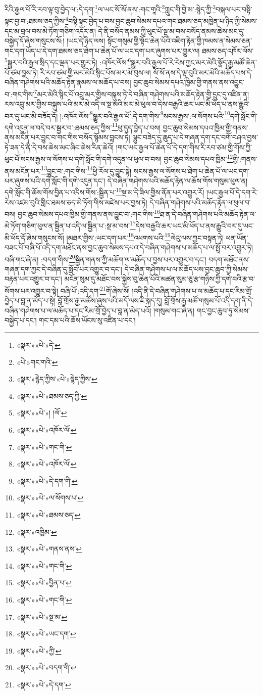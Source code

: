 རིའི་རྒྱལ་པོ་རི་རབ་ལྟ་བུ་བྱེད་ལ་:དེ་དག་\footnote{«སྣར་»«པེ་»དེ་}ལ་ཡང་སོ་སོ་ནས་:གང་གཱའི་\footnote{«པེ་»གང་གའི་}ཀླུང་གི་བྱེ་མ་:སྙེད་ཀྱི་\footnote{«སྣར་»རྙེད་ཀྱིས་«པེ་»སྙེད་ཀྱིས་}བསྐལ་པར་བསྟི་སྟང་བྱ་བ་:ཐམས་ཅད་ཀྱིས་\footnote{«སྣར་»«པེ་»ཐམས་ཅད་ཀྱི་}བསྟི་སྟང་བྱེད་པ་བས་བྱང་ཆུབ་སེམས་དཔའ་གང་ཐམས་ཅད་མཁྱེན་པ་ཉིད་ཀྱི་སེམས་དང་མ་བྲལ་བས་མེ་ཏོག་གཅིག་འདོར་ན། དེ་ནི་བསོད་ནམས་ཀྱི་ཕུང་པོ་སྔ་མ་བས་བསོད་ནམས་ཆེས་མང་དུ་བསྐྱེད་དོ་ཞེས་གསུངས་སོ:། །ཡང་དེ་ཉིད་ལས། སྟོང་གསུམ་གྱི་སྟོང་ཆེན་པོའི་འཇིག་རྟེན་གྱི་ཁམས་ན་སེམས་ཅན་གང་དག་ཡོད་པ་དེ་དག་ཐམས་ཅད་ཐེག་པ་ཆེན་པོ་ལ་ཡང་དག་པར་ཞུགས་པར་གྱུར་ལ། ཐམས་ཅད་འཁོར་ལོས་\footnote{«སྣར་»«པེ་»། །ལོ་}སྒྱུར་བའི་རྒྱལ་སྲིད་དང་ལྡན་པར་གྱུར་ཏེ། :འཁོར་ལོས་\footnote{«སྣར་»«པེ་»འཁོར་ལོ་}སྒྱུར་བའི་རྒྱལ་པོ་རེ་རེས་ཀྱང་མར་མེའི་སྣོད་རྒྱ་མཚོ་ཆེན་པོ་ཙམ་བྱས་ཏེ། རི་རབ་ཙམ་གྱི་མར་མེའི་སྙིང་པོས་མར་མེ་བུས་ལ། སོ་སོ་ནས་དེ་ལྟ་བུའི་མར་མེའི་མཆོད་པས་དེ་བཞིན་གཤེགས་པའི་མཆོད་རྟེན་རྣམས་ལ་མཆོད་པ་བས། བྱང་ཆུབ་སེམས་དཔའ་ཁྱིམ་གྱི་གནས་ནས་འབྱུང་བ་:གང་གིས་\footnote{«སྣར་»«པེ་»གང་གི་}མར་མེའི་སྙིང་པོ་འབྲུ་མར་གྱིས་བསྐུས་ཏེ་དེ་བཞིན་གཤེགས་པའི་མཆོད་རྟེན་གྱི་དྲུང་དུ་འཛིན་ན། རས་འབྲུ་མར་གྱིས་བསྐུས་པའི་མར་མེ་འདི་ལ་སྔ་མའི་མར་མེ་ཕུལ་བ་དེས་བརྒྱའི་ཆར་ཡང་མི་ཕོད་པ་ནས་རྒྱུའི་བར་དུ་ཡང་མི་བཟོད་དོ། །:འཁོར་ལོས་\footnote{«སྣར་»«པེ་»འཁོར་ལོ་}སྒྱུར་བའི་རྒྱལ་པོ་:དེ་དག་གིས་\footnote{«སྣར་»«པེ་»དེ་དག་གི་}སངས་རྒྱས་:ལ་སོགས་པའི་\footnote{«སྣར་»«པེ་»ལ་སོགས་པ་}དགེ་སློང་གི་དགེ་འདུན་ལ་བདེ་བར་སྦྱར་བ་:ཐམས་ཅད་ཀྱིས་\footnote{«སྣར་»«པེ་»ཐམས་ཅད་}ཕུ་དུད་བྱེད་པ་བས། བྱང་ཆུབ་སེམས་དཔའ་ཁྱིམ་གྱི་གནས་ནས་མངོན་པར་བྱུང་བ་གང་གིས་བསོད་སྙོམས་བླངས་ཏེ། ལྷུང་བཟེད་དུ་ཆུད་པ་དེ་གཞན་དག་དང་བགོ་བཤའ་བྱས་ཏེ་ཟན་དེ་ནི་དེ་བས་ཆེས་མང་ཞིང་ཆེས་རིན་ཆེའོ། །གང་ཡང་རྒྱལ་པོ་ཆེན་པོ་དེ་དག་གིས་རི་རབ་ཙམ་གྱི་གོས་ཀྱི་ཕུང་པོ་སངས་རྒྱས་ལ་སོགས་པ་དགེ་སློང་གི་དགེ་འདུན་ལ་ཕུལ་བ་བས། བྱང་ཆུབ་སེམས་དཔའ་ཁྱིམ་\footnote{«སྣར་»འཁྱིམ་}གྱི་:གནས་ནས་མངོན་པར་\footnote{«སྣར་»«པེ་»གནས་ནས་}བྱུང་བ་:གང་གིས་\footnote{«སྣར་»«པེ་»གང་གི་}ཕྱི་རོལ་དུ་བྱུང་སྟེ། སངས་རྒྱས་ལ་སོགས་པ་ཐེག་པ་ཆེན་པོ་ལ་ཡང་དག་པར་ཞུགས་པའི་དགེ་སློང་གི་དགེ་འདུན་དང་། དེ་བཞིན་གཤེགས་པའི་མཆོད་རྟེན་ལ་ཆོས་གོས་གསུམ་ཕུལ་ན། དགེ་སློང་གི་ཆོས་གོས་བྱིན་པ་འདིས་གོས་:སྦྱིན་པ་\footnote{«སྣར་»«པེ་»བྱིན་པ་}སྔ་མ་དེ་ཟིལ་གྱིས་ནོན་པར་འགྱུར་རོ། །ཡང་རྒྱལ་པོ་དེ་དག་རེ་རེས་འཛམ་བུའི་གླིང་ཐམས་ཅད་མེ་ཏོག་གིས་མཛེས་པར་བྱས་ཏེ། དེ་བཞིན་གཤེགས་པའི་མཆོད་རྟེན་ལ་ཕུལ་བ་བས། བྱང་ཆུབ་སེམས་དཔའ་ཁྱིམ་གྱི་གནས་ནས་བྱུང་བ་:གང་གིས་\footnote{«སྣར་»«པེ་»གང་གི་}ཐ་ན་དེ་བཞིན་གཤེགས་པའི་མཆོད་རྟེན་ལ་མེ་ཏོག་གཅིག་ཕུལ་ན་སྦྱིན་པ་འདི་ལ་སྦྱིན་པ་:སྔ་མ་བས་\footnote{«སྣར་»«པེ་»སྔ་མ་}དེས་བརྒྱའི་ཆར་ཡང་མི་ཕོད་པ་ནས་རྒྱུའི་བར་དུ་ཡང་མི་ཕོད་དོ་ཞེས་གསུངས་སོ། །མཐར་གྱིས་:ཡང་དག་པར་\footnote{«སྣར་»«པེ་»ཡང་དག་}འཕགས་པའི་\footnote{«སྣར་»«པེ་»ཀྱི་}ལེའུ་ལས་ཀྱང་བསྟན་ཏེ། ཕན་ཡོན་བཟང་པོ་བཞི་པོ་འདི་དག་མཐོང་ནས་བྱང་ཆུབ་སེམས་དཔའ་དེ་བཞིན་གཤེགས་པ་མཆོད་པ་ལ་སྤྲོ་བར་འགྱུར་ཏེ། བཞི་གང་ཞེ་ན། :བདག་གིས་\footnote{«སྣར་»«པེ་»བདག་གི་}སྦྱིན་གནས་ཀྱི་མཆོག་ལ་མཆོད་པ་བྱས་པར་འགྱུར་བ་དང་། བདག་མཐོང་ནས་གཞན་དག་ཀྱང་དེ་བཞིན་དུ་སློབ་པར་འགྱུར་བ་དང་། དེ་བཞིན་གཤེགས་པ་ལ་མཆོད་པས་བྱང་ཆུབ་ཀྱི་སེམས་བརྟན་པར་འགྱུར་བ་དང་། མངོན་སུམ་དུ་མཐོང་བས་སྐྱེས་བུ་ཆེན་པོའི་མཚན་སུམ་ཅུ་རྩ་གཉིས་ཀྱི་དགེ་བའི་རྩ་བ་སོགས་པར་འགྱུར་བ་སྟེ། བཞི་པོ་:འདི་དག་\footnote{«སྣར་»«པེ་»དེ་དག་}གོ་ཞེས་སོ། །འདི་ནི་དེ་བཞིན་གཤེགས་པ་ལ་མཆོད་པ་དང་རིམ་གྲོ་བྱེད་པ་བླ་ན་མེད་པ་སྟེ། བློ་གྲོས་རྒྱ་མཚོས་ཞུས་པའི་མདོ་ལས་ཇི་སྐད་དུ། བློ་གྲོས་རྒྱ་མཚོ་གསུམ་པོ་འདི་དག་ནི་དེ་བཞིན་གཤེགས་པ་ལ་མཆོད་པ་དང་རིམ་གྲོ་བྱེད་པ་བླ་ན་མེད་པའོ། །གསུམ་གང་ཞེ་ན། གང་བྱང་ཆུབ་ཏུ་སེམས་བསྐྱེད་པ་དང་། གང་དམ་པའི་ཆོས་ཡོངས་སུ་འཛིན་པ་དང་། 